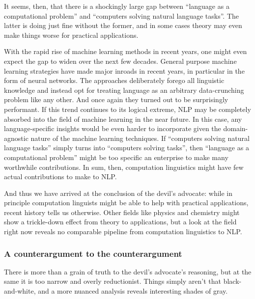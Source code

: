 It seems, then, that there is a shockingly large gap between ``language as a computational problem'' and ``computers solving natural language tasks''.
The latter is doing just fine without the former, and in some cases theory may even make things worse for practical applications.

With the rapid rise of machine learning methods in recent years, one might even expect the gap to widen over the next few decades.
General purpose machine learning strategies have made major inroads in recent years, in particular in the form of neural networks.
The approaches deliberately forego all linguistic knowledge and instead opt for treating language as an arbitrary data-crunching problem like any other.
And once again they turned out to be surprisingly performant.
If this trend continues to its logical extreme, NLP may be completely absorbed into the field of machine learning in the near future.
In this case, any language-specific insights would be even harder to incorporate given the domain-agnostic nature of the machine learning techniques.
If ``computers solving natural language tasks'' simply turns into ``computers solving tasks'', then ``language as a computational problem'' might be too specific an enterprise to make many worthwhile contributions.
In sum, then, computation linguistics might have few actual contributions to make to NLP\@.

And thus we have arrived at the conclusion of the devil's advocate: while in principle computation linguists might be able to help with practical applications, recent history tells us otherwise.
Other fields like physics and chemistry might show a trickle-down effect from theory to applications, but a look at the field right now reveals no comparable pipeline from computation linguistics to NLP.

\subsubsection{A counterargument to the counterargument}
\label{sub:formal_arguments_practical_counter}

There is more than a grain of truth to the devil's advocate's reasoning, but at the same it is too narrow and overly reductionist.
Things simply aren't that black-and-white, and a more nuanced analysis reveals interesting shades of gray.


